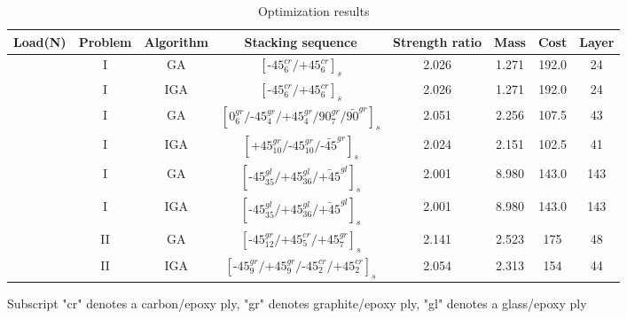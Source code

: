 \documentclass[Afour,sagev,times]{sagej}
\begin{document}
\begin{table}
\small\sf\centering
\caption{Optimization results}
\begin{tabular}{cccccccc}
	\toprule
	Load(N)                                                 &  Problem  &   Algorithm      & Stacking sequence                                    & Strength ratio  & Mass  &  Cost   & Layer    \\ 
	\midrule																								  
	     &       I   &  GA   &  $[\text{-}45_{6}^{cr}/\text{+}45_{6}^{cr}]_s$                        & 2.026           & 1.271 &  192.0  & 24  \\
	                                                        &       I   &  IGA   &  $[\text{-}45_{6}^{cr}/\text{+}45_{6}^{cr}]_s$                        & 2.026           & 1.271 &  192.0  & 24  \\
															&       I   &  GA    &  $[0_6^{gr}/\text{-}45_{4}^{gr}/\text{+}45_{4}^{gr}/90_{7}^{gr}/\bar{90}^{gr}]_s$     & 2.051           & 2.256 &  107.5  & 43  \\
															&       I   &  IGA    &  $[\text{+}45_{10}^{gr}/\text{-}45_{10}^{gr}/\bar{\text{-}45}^{gr}]_s$    & 2.024           & 2.151 &  102.5  & 41  \\
															&       I   &  GA    &  $[\text{-}45_{35}^{gl}/\text{+}45_{36}^{gl}/\bar{\text{+}45}^{gl}]_s$    & 2.001           & 8.980 &  143.0  & 143  \\
															&       I   &  IGA    &  $[\text{-}45_{35}^{gl}/\text{+}45_{36}^{gl}/\bar{\text{+}45}^{gl}]_s$    & 2.001           & 8.980 &  143.0  & 143  \\
															&       II  &  GA    &
	$[\text{-}45_{12}^{gr}/\text{+}45_{5}^{cr}/\text{+}45_{7}^{gr}]_s$         & 2.141
										  & 2.523 & 175& 48  \\
															&       II  &  IGA    &
	$[\text{-}45_{9}^{gr}/\text{+}45_{9}^{gr}/\text{-}45_{2}^{cr}/\text{+}45_{2}^{cr}]_s$         & 2.054
										  & 2.313 & 154& 44  \\
	\bottomrule
\end{tabular}
\label{tab:NxNy}
\end{table}

\begin{tablenotes}\footnotesize
\item{Subscript "cr" denotes a carbon/epoxy ply, "gr" denotes graphite/epoxy ply, "gl" denotes a
	glass/epoxy ply}
\end{tablenotes}
\end{document}
